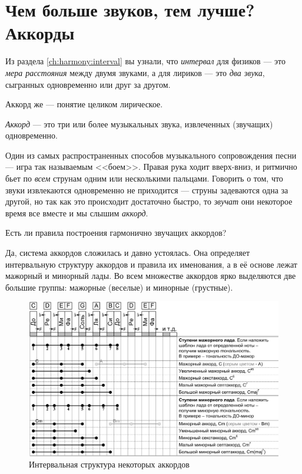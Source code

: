 \section{Чем больше звуков, тем лучше? Аккорды}
\label{ch:harmony:chords}

Из раздела \ref{ch:harmony:interval} вы узнали, что \emph{интервал} для физиков --- это \emph{мера расстояния} между двумя звуками, а для лириков --- это \emph{два звука}, сыгранных одновременно или друг за другом.

Аккорд же --- понятие целиком лирическое.

\begin{Definition}[Аккорд]
    \emph{Аккорд} --- это три или более музыкальных звука, извлеченных (звучащих) одновременно.
\end{Definition}

Один из самых распространенных способов музыкального сопровождения песни --- игра так называемым <<боем>>. Правая рука ходит вверх-вниз, и ритмично бьет по \emph{всем} струнам одним или несколькими пальцами. Говорить о том, что звуки извлекаются одновременно не приходится --- струны задеваются одна за другой, но так как это происходит достаточно быстро, то \emph{звучат} они некоторое время все вместе и мы слышим \emph{аккорд}.

Есть ли правила построения гармонично звучащих аккордов?

Да, система аккордов сложилась и давно устоялась. Она определяет интервальную структуру аккордов и правила их именования, а в её основе лежат мажорный и минорный лады. Во всем множестве аккордов ярко выделяются две большие группы: мажорные (веселые) и минорные (грустные).

\begin{figure}[!ht]
    \centering
    \includegraphics[width=\textwidth]{fig/chords/structure} 
    \caption{Интервальная структура некоторых аккордов}\label{fig:harmony:chords:structure}
\end{figure} 

